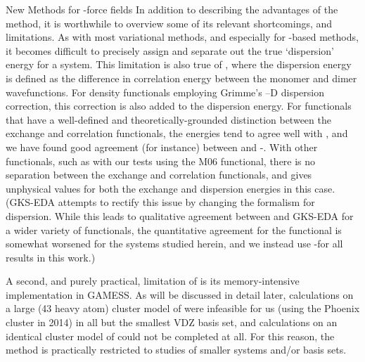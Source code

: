 \begin{section}{New Methods for \cus-\mof force fields}
In addition to describing the advantages of the \lmoeda method, it is worthwhile to overview
some of its relevant shortcomings, and limitations. 
As with most variational \eda methods,\cite{Pastorczak2017} and especially for
\dft-based methods, it becomes difficult to precisely assign and separate out the true
`dispersion' energy for a system. This limitation is also true of \lmoeda,
where the dispersion energy is defined as the difference in correlation energy
between the monomer and dimer wavefunctions. For density functionals employing
Grimme's --D dispersion correction, this correction is also added to the
\lmoeda dispersion energy. For functionals that have a well-defined and
theoretically-grounded distinction between the exchange and correlation
functionals, the \lmoeda energies tend to agree well with \sapt, and we have
found good agreement (for instance) between \sapt and \lmoeda-\pbeod. With other
functionals, such as with our tests using the M06 functional, there is no
separation between the exchange and correlation functionals, and \lmoeda gives
unphysical values for both the exchange and dispersion energies in this case.
(GKS-EDA attempts to rectify this issue by changing the \lmoeda formalism for
dispersion. While this leads to qualitative agreement between \sapt and
GKS-EDA for a wider variety of functionals, the quantitative agreement for the
\pbeod functional is somewhat worsened for the systems studied herein, and we
instead use \lmoeda-\pbeod for all results in this work.)

A second, and purely practical, limitation of \lmoeda is its memory-intensive
implementation in GAMESS. As will be discussed in detail later,
calculations on a large (43 heavy atom) cluster model of \mgmof were
infeasible for us (using the Phoenix cluster in 2014) in all but the smallest VDZ
basis set, and calculations on an identical cluster model of \comof could not
be completed at all. For this reason, the \lmoeda method is practically
restricted to studies of smaller systems and/or basis sets.


\end{section}
